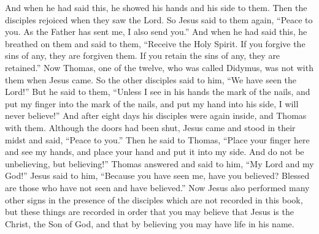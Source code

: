 \begin{biblechapter}
\verse And when he had said this, he showed his hands and his side to them. Then the disciples rejoiced when they saw the Lord.
\verse So Jesus said to them again, “Peace to you. As the Father has sent me, I also send you.”
\verse And when he had said this, he breathed on them and said to them, “Receive the Holy Spirit.
\verse If you forgive the sins of any, they are forgiven them. If you retain the sins of any, they are retained.”
 Now Thomas, one of the twelve, who was called Didymus, was not with them when Jesus came.
\verse So the other disciples said to him, “We have seen the Lord!” But he said to them, “Unless I see in his hands the mark of the nails, and put my finger into the mark of the nails, and put my hand into his side, I will never believe!”
\verse And after eight days his disciples were again inside, and Thomas with them. Although the doors had been shut, Jesus came and stood in their midst and said, “Peace to you.”
\verse Then he said to Thomas, “Place your finger here and see my hands, and place your hand and put it into my side. And do not be unbelieving, but believing!”
\verse Thomas answered and said to him, “My Lord and my God!”
\verse Jesus said to him, “Because you have seen me, have you believed? Blessed are those who have not seen and have believed.”
 Now Jesus also performed many other signs in the presence of the disciples which are not recorded in this book,
\verse but these things are recorded in order that you may believe that Jesus is the Christ, the Son of God, and that by believing you may have life in his name.
\end{biblechapter}

